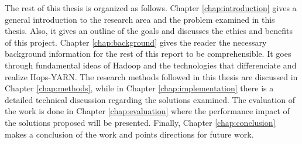 The rest of this thesis is organized as follows. Chapter 
\ref{chap:introduction} gives a general introduction to the
research area and the problem examined in this thesis. Also, it gives
an outline of the goals and discusses the ethics and benefits of this
project. Chapter \ref{chap:background} gives the reader the necessary
background information for the rest of this report to be
comprehensible. It goes through fundamental ideas of Hadoop and the
technologies that differenciate and realize Hops-YARN. The research methods followed in
this thesis are discussed in Chapter \ref{chap:methods}, while in Chapter
\ref{chap:implementation} there is a detailed technical discussion
regarding the solutions examined. The evaluation of the work is done
in Chapter \ref{chap:evaluation} where the performance impact of the
solutions proposed will be presented. Finally, Chapter
\ref{chap:conclusion} makes a conclusion of the work and points
directions for future work.
